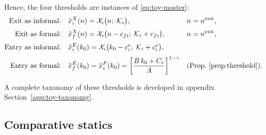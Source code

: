 \documentclass[12pt]{article}
\begin{document}
Hence, the four thresholds are instances of \eqref{eq:toy-master}:
\begin{align}
  \text{Exit as informal:}\quad
  &\hat x^X_{i}(n)=\mathcal{X}_{i}\big(n;\;\mathcal{K}_{i}\big),
  &&n=n^{\text{exit}},
  \label{eq:toy-thXi}\\[2pt]
  \text{Exit as formal:}\quad
  &\hat x^X_{f}(n)=\mathcal{X}_{i}\big(n-c_{fi};\;
    \mathcal{K}_{i}+c_{fi}\big),
  &&n=n^{\text{exit}},
  \label{eq:toy-thXf}\\[2pt]
  \text{Entry as informal:}\quad
  &\hat x^E_{i}(k_{0})=\mathcal{X}_{i}\big(k_{0}-c^e_{i};\;
    \mathcal{K}_{i}+c^e_{i}\big),
  \label{eq:toy-thEi}\\[2pt]
  \text{Entry as formal:}\quad
  &\hat x^E_{f}(k_{0})=\hat x^F_{e}(k_{0})
    =\left[\frac{B\,k_{0}+C_{e}}{A}\right]^{1-\gamma}
  &&\text{(Prop.~\ref{prop:threshold})} .
  \label{eq:toy-thEf}
\end{align}


A complete taxonomy of these thresholds is developed in appendix Section~\ref{app:toy-taxonomy}.

\subsection{Comparative statics}
\label{app:comparative_stats}
 
\end{document}
